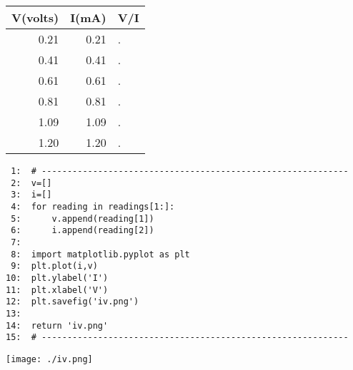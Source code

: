 \documentclass[11pt]{article}
\begin{document}
\begin{center}
\begin{tabular}{rrl}
 V(volts)  &  I(mA)  &  V/I  \\
\hline
     0.21  &   0.21  &  .    \\
     0.41  &   0.41  &  .    \\
     0.61  &   0.61  &  .    \\
     0.81  &   0.81  &  .    \\
     1.09  &   1.09  &  .    \\
     1.20  &   1.20  &  .    \\
\hline
\end{tabular}
\end{center}





\begin{verbatim}
 1:  # ------------------------------------------------------------
 2:  v=[]
 3:  i=[]
 4:  for reading in readings[1:]:
 5:      v.append(reading[1])
 6:      i.append(reading[2])
 7:  
 8:  import matplotlib.pyplot as plt
 9:  plt.plot(i,v)
10:  plt.ylabel('I')
11:  plt.xlabel('V')
12:  plt.savefig('iv.png')
13:  
14:  return 'iv.png'
15:  # ------------------------------------------------------------
\end{verbatim}

\texttt{[image: ./iv.png]}
\end{document}
